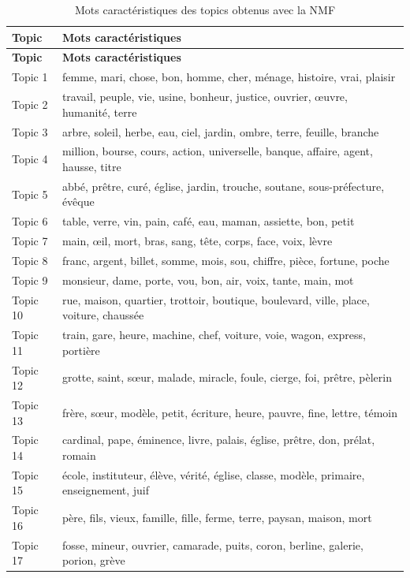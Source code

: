 \begin{longtable}{p{1.8cm}p{11.5cm}}
\caption{Mots caractéristiques des topics obtenus avec la NMF} \\
\toprule
\textbf{Topic} & \textbf{Mots caractéristiques} \\
\midrule
\endfirsthead

\toprule
\textbf{Topic} & \textbf{Mots caractéristiques} \\
\midrule
\endhead
Topic 1 & femme, mari, chose, bon, homme, cher, ménage, histoire, vrai, plaisir \\
Topic 2 & travail, peuple, vie, usine, bonheur, justice, ouvrier, œuvre, humanité, terre \\
Topic 3 & arbre, soleil, herbe, eau, ciel, jardin, ombre, terre, feuille, branche \\
Topic 4 & million, bourse, cours, action, universelle, banque, affaire, agent, hausse, titre \\
Topic 5 & abbé, prêtre, curé, église, jardin, trouche, soutane, sous-préfecture, évêque \\
Topic 6 & table, verre, vin, pain, café, eau, maman, assiette, bon, petit \\
Topic 7 & main, œil, mort, bras, sang, tête, corps, face, voix, lèvre \\
Topic 8 & franc, argent, billet, somme, mois, sou, chiffre, pièce, fortune, poche \\
Topic 9 & monsieur, dame, porte, vou, bon, air, voix, tante, main, mot \\
Topic 10 & rue, maison, quartier, trottoir, boutique, boulevard, ville, place, voiture, chaussée \\
Topic 11 & train, gare, heure, machine, chef, voiture, voie, wagon, express, portière \\
Topic 12 & grotte, saint, sœur, malade, miracle, foule, cierge, foi, prêtre, pèlerin \\
Topic 13 & frère, sœur, modèle, petit, écriture, heure, pauvre, fine, lettre, témoin \\
Topic 14 & cardinal, pape, éminence, livre, palais, église, prêtre, don, prélat, romain \\
Topic 15 & école, instituteur, élève, vérité, église, classe, modèle, primaire, enseignement, juif \\
Topic 16 & père, fils, vieux, famille, fille, ferme, terre, paysan, maison, mort \\
Topic 17 & fosse, mineur, ouvrier, camarade, puits, coron, berline, galerie, porion, grève \\

\end{longtable}
